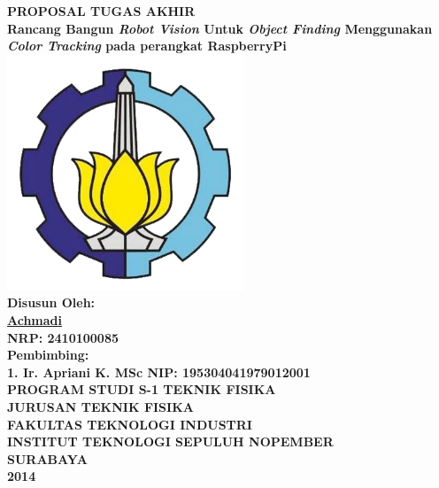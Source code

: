 \documentclass[a4paper,12pt]{article}
\title{}
\author{}
\date{}
\begin{document}
\begin{center}
  \textbf{ \Large{PROPOSAL TUGAS AKHIR } }\\[5pt]
  \textbf{ \large{Rancang Bangun \textit{Robot Vision} Untuk \textit{Object Finding} Menggunakan \textit{Color Tracking} pada perangkat RaspberryPi } }
  \\[50pt]
  \includegraphics[width=200pt]{ITS}
  \\[50pt]
  \textbf{ \large{Disusun Oleh:} }\\
  \underline{\textbf{ \large{Achmadi} } }\\
  \textbf{ \large{NRP: 2410100085 } }\\[40pt]
  \textbf{ \large{Pembimbing: } }\\
  \textbf{ \large{1. Ir. Apriani K. MSc \hspace{35pt} NIP: 195304041979012001} }\\[60pt]
  \textbf{ \large{PROGRAM STUDI S-1 TEKNIK FISIKA } }\\
  \textbf{ \large{JURUSAN TEKNIK FISIKA } }\\
  \textbf{ \large{FAKULTAS TEKNOLOGI INDUSTRI } }\\
  \textbf{ \large{INSTITUT TEKNOLOGI SEPULUH NOPEMBER } }\\
  \textbf{ \large{SURABAYA } }\\
  \textbf{ \large{2014 } }\\
\end{center}
\end{document}
